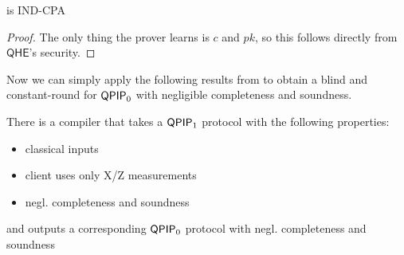 \begin{thm}
	 is IND-CPA
\end{thm}
\begin{proof}
	The only thing the prover learns is $c$ and $pk$, so this follows directly from $\mathsf{QHE}$'s security.
\end{proof}

Now we can simply apply the following results from \cite{parallelrep} to obtain a blind and constant-round for $\operatorname{\mathsf{QPIP}}_0$ with negligible completeness and soundness.
\begin{thm}
	There is a compiler that takes a $\operatorname{\mathsf{QPIP}}_1$ protocol with the following properties:
	\begin{itemize}
		\item classical inputs
		\item client uses only X/Z measurements
		\item negl. completeness and soundness
	\end{itemize}
	and outputs a corresponding $\operatorname{\mathsf{QPIP}}_0$ protocol with negl. completeness and soundness 
\end{thm}

